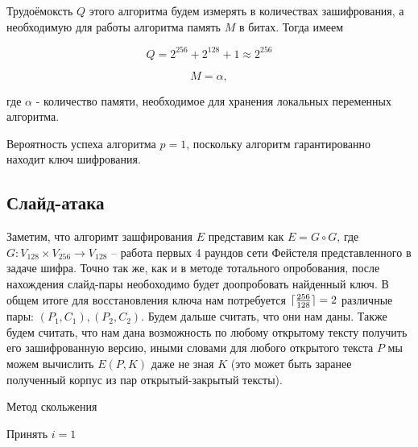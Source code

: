 \documentclass[a4paper,12pt]{article}
\DeclarePairedDelimiter{\ceil}{\lceil}{\rceil}
\theoremstyle{definition}
\begin{document}
	Трудоёмоксть $Q$ этого алгоритма будем измерять в количествах зашифрования, а необходимую для работы алгоритма память $M$ в битах. Тогда имеем
	
	\[ Q = 2^{256} + 2^{128} + 1 \approx 2^{256} \]
	
	\[ M = \alpha, \]
	
	где $\alpha$ - количество памяти, необходимое для хранения локальных переменных алгоритма.
	
	Вероятность успеха алгоритма $p = 1$, поскольку алгоритм гарантированно находит ключ шифрования.

	\subsection*{Слайд-атака}
	
	Заметим, что алгоримт зашфирования $E$ представим как $E=G \circ G$, где $G: V_{128} \times V_{256} \rightarrow V_{128}$ -- работа первых 4 раундов сети Фейстеля представленного в задаче шифра. Точно так же, как и в методе тотального опробования, после нахождения слайд-пары необоходимо будет доопробовать найденный ключ. В общем итоге для восстановления ключа нам потребуется $\ceil{\frac{256}{128}} = 2$ различные пары: $(P_1, C_1), (P_2, C_2)$. Будем дальше считать, что они нам даны. Также будем считать, что нам дана возможность по любому открытому тексту получить его зашифрованную версию, иными словами для любого открытого текста $P$ мы можем вычислить $E(P, K)$ даже не зная $K$ (это может быть заранее полученный корпус из пар открытый-закрытый тексты).
	
	\begin{algorithm}[H]
		
		\caption{Метод скольжения}
		\label{alg:Slide}
		\SetAlgoNoEnd 
		
		
		Принять $i=1$
		
	\end{algorithm}	
\end{document}
